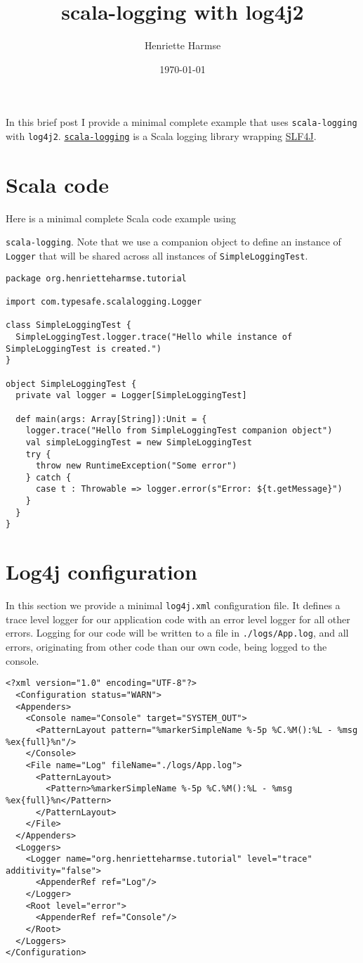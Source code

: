 \documentclass{amsart}
\title{scala-logging with log4j2}
\author{Henriette Harmse}
\date{\today}
\begin{document}
  \maketitle
  In this brief post I provide a minimal complete example that uses \texttt{scala-logging} with \texttt{log4j2}. \href{https://github.com/lightbend/scala-logging}{\texttt{scala-logging}} is a Scala logging library wrapping \href{http://www.slf4j.org/}{SLF4J}.  
  
  \section{Scala code}
  Here is a minimal complete Scala code example using {\texttt{scala-logging}. Note that we use a companion object to define an instance of \texttt{Logger} that will be shared across all instances of \texttt{SimpleLoggingTest}.
\begin{small}
\begin{verbatim} 
package org.henrietteharmse.tutorial

import com.typesafe.scalalogging.Logger

class SimpleLoggingTest {
  SimpleLoggingTest.logger.trace("Hello while instance of SimpleLoggingTest is created.")
}

object SimpleLoggingTest {
  private val logger = Logger[SimpleLoggingTest]

  def main(args: Array[String]):Unit = {
    logger.trace("Hello from SimpleLoggingTest companion object")
    val simpleLoggingTest = new SimpleLoggingTest
    try {
      throw new RuntimeException("Some error")
    } catch {
      case t : Throwable => logger.error(s"Error: ${t.getMessage}")
    }    
  }
}
\end{verbatim}
\end{small}

  \section{Log4j configuration}
  In this section we provide a minimal \texttt{log4j.xml} configuration file. It defines a trace level logger for our application code with an error level logger for all other errors. Logging for our code will be written to a file in \texttt{./logs/App.log}, and all errors, originating from other code than our own code, being logged to the console.
\begin{small}
	\begin{verbatim} 
<?xml version="1.0" encoding="UTF-8"?>
  <Configuration status="WARN">
  <Appenders>
    <Console name="Console" target="SYSTEM_OUT">
      <PatternLayout pattern="%markerSimpleName %-5p %C.%M():%L - %msg %ex{full}%n"/>
    </Console>
    <File name="Log" fileName="./logs/App.log">
      <PatternLayout>
        <Pattern>%markerSimpleName %-5p %C.%M():%L - %msg %ex{full}%n</Pattern>
      </PatternLayout>
    </File>    
  </Appenders>
  <Loggers>
    <Logger name="org.henrietteharmse.tutorial" level="trace" additivity="false">
      <AppenderRef ref="Log"/>
    </Logger>
    <Root level="error">
      <AppenderRef ref="Console"/>
    </Root>
  </Loggers>
</Configuration>
	\end{verbatim}
\end{small}  

}
\end{document}
